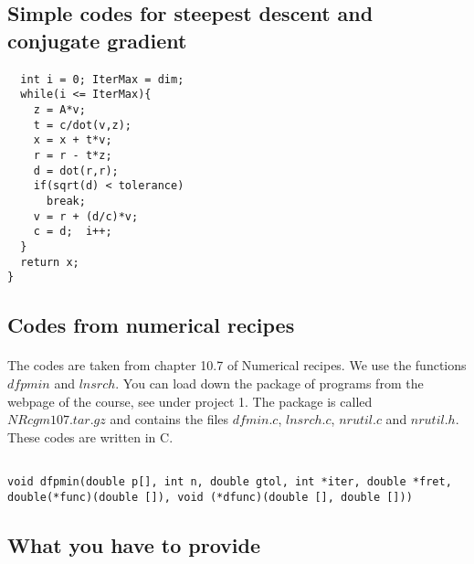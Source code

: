 \documentclass[%
twoside,                 %
final,                   %
10pt]{article}
\begin{document}
\subsection*{Simple codes for  steepest descent and conjugate gradient}

\paragraph{}
\begin{verbatim}
  int i = 0; IterMax = dim;
  while(i <= IterMax){
    z = A*v;
    t = c/dot(v,z);
    x = x + t*v;
    r = r - t*z;
    d = dot(r,r);
    if(sqrt(d) < tolerance)
      break;
    v = r + (d/c)*v;
    c = d;  i++;
  }
  return x;
} 
\end{verbatim}




\subsection*{Codes from numerical recipes}

\paragraph{}
The codes are taken from chapter 10.7 of Numerical recipes.  We use the functions
$dfpmin$ and $lnsrch$.  You can load down the package of programs from the webpage of
the course, see under project 1.  
The package is called $NRcgm107.tar.gz$ and contains the files 
$dfmin.c$, $lnsrch.c$, $nrutil.c$ and $nrutil.h$. 
These codes are  written in C.
\begin{verbatim}

void dfpmin(double p[], int n, double gtol, int *iter, double *fret,
double(*func)(double []), void (*dfunc)(double [], double []))

\end{verbatim}




\subsection*{What you have to provide}
\end{document}
